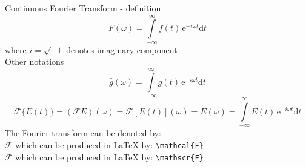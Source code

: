 \documentclass[10pt,aspectratio=169]{beamer} %
\newcommand{\ud}{\mathrm{d}}
\newcommand{\myexp}{\mathrm{e}}
\begin{document}
\begin{frame}[fragile,label=frame3]{Continuous Fourier Transform - definition}
	\begin{equation*}
	F(\omega) = \int \limits_{-\infty}^{\infty} f(t)\, \myexp^{-i \omega t} \ud t 
	\end{equation*}
	where \(i=\sqrt{-1}\) denotes imaginary component\\
Other notations
	\begin{equation*}
	\hat{g}(\omega) = \int \limits_{-\infty}^{\infty} g(t)\, \myexp^{-i \omega t} \ud t 
	\end{equation*}
	\begin{equation*}
	\mathscr{F}\{E(t)\}= 	\left(\mathscr{F} E \right)(\omega)=\mathcal{F} \left[E(t) \right](\omega) =\tilde{E}(\omega) =  \int \limits_{-\infty}^{\infty} E(t)\, \myexp^{-i \omega t} \ud t 
	\end{equation*}
The Fourier transform can be denoted by:\\
 \(\mathcal{F}\) which can be produced in LaTeX by: \verb+\mathcal{F}+\\
\(\mathscr{F}\) which can be produced in LaTeX by: \verb+\mathscr{F}+\\

\end{frame}
\end{document}

